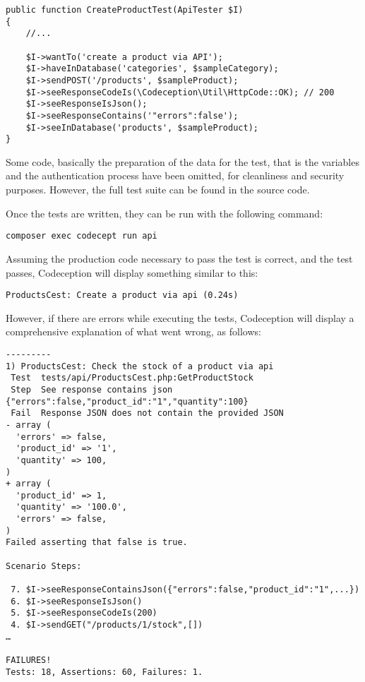 \begin{verbatim}
public function CreateProductTest(ApiTester $I)
{
	//...

	$I->wantTo('create a product via API');
	$I->haveInDatabase('categories', $sampleCategory);
	$I->sendPOST('/products', $sampleProduct);
	$I->seeResponseCodeIs(\Codeception\Util\HttpCode::OK); // 200
	$I->seeResponseIsJson();
	$I->seeResponseContains('"errors":false');
	$I->seeInDatabase('products', $sampleProduct);
}
\end{verbatim}

Some code, basically the preparation of the data for the test, that is the  variables and the authentication process have been omitted, for cleanliness and security purposes. However, the full test suite can be found in the source code.

Once the tests are written, they can be run with the following command:

\begin{verbatim}
composer exec codecept run api
\end{verbatim}

Assuming the production code necessary to pass the test is correct, and the test passes, Codeception will display something similar to this:

\begin{verbatim}
ProductsCest: Create a product via api (0.24s)
\end{verbatim}

However, if there are errors while executing the tests, Codeception will display a comprehensive explanation of what went wrong, as follows:

\begin{verbatim}
---------
1) ProductsCest: Check the stock of a product via api
 Test  tests/api/ProductsCest.php:GetProductStock
 Step  See response contains json {"errors":false,"product_id":"1","quantity":100}
 Fail  Response JSON does not contain the provided JSON
- array (
  'errors' => false,
  'product_id' => '1',
  'quantity' => 100,
)
+ array (
  'product_id' => 1,
  'quantity' => '100.0',
  'errors' => false,
)
Failed asserting that false is true.

Scenario Steps:

 7. $I->seeResponseContainsJson({"errors":false,"product_id":"1",...})
 6. $I->seeResponseIsJson()
 5. $I->seeResponseCodeIs(200)
 4. $I->sendGET("/products/1/stock",[])
…

FAILURES!
Tests: 18, Assertions: 60, Failures: 1.
\end{verbatim}

